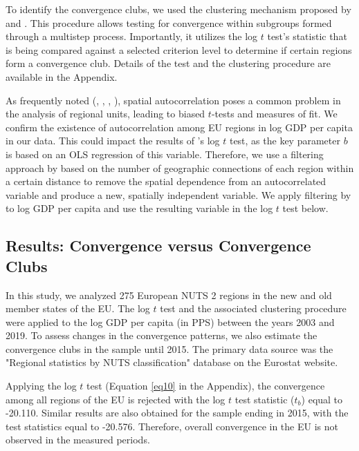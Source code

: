 \documentclass[11pt]{article}
\begin{document}
To identify the convergence clubs, we used the clustering mechanism proposed by \citet{phillips2009economic} and \citet{bartkowska2012regional}. This procedure allows testing for convergence within subgroups formed through a multistep process. Importantly, it utilizes the log $t$ test's statistic that is being compared against a selected criterion level to determine if certain regions form a convergence club. Details of the test and the clustering procedure are available in the Appendix.

As frequently noted (\citet{dall2008regional}, \citet{magrini2004regional}, \citet{anselin1991properties}, \citet{anselin2001spatial}), spatial autocorrelation poses a common problem in the analysis of regional units, leading to biased $t$-tests and measures of fit. We confirm the existence of autocorrelation among EU regions in log GDP per capita in our data. This could impact the results of \citeauthor{phillips2007transition}'s log $t$ test, as the key parameter $b$ is based on an OLS regression of this variable. Therefore, we use a filtering approach by \cite{getis2002comparative} based on the number of geographic connections of each region within a certain distance to remove the spatial dependence from an autocorrelated variable and produce a new, spatially independent variable. We apply filtering by \cite{getis2002comparative} to log GDP per capita and use the resulting variable in the log $t$ test below.

\subsection{Results: Convergence versus Convergence Clubs}
In this study, we analyzed 275 European NUTS 2 regions in the new and old member states of the EU. The log $t$ test and the associated clustering procedure were applied to the log GDP per capita (in PPS) between the years 2003 and 2019. To assess changes in the convergence patterns, we also estimate the convergence clubs in the sample until 2015. The primary data source was
 the "Regional statistics by NUTS classification" database on the Eurostat website.

Applying the log $t$ test (Equation \ref{eq10} in the Appendix), the convergence among all regions of the EU is rejected with the log $t$ test statistic ($t_b$) equal to -20.110. Similar results are also obtained for the sample ending in 2015, with the test statistics equal to -20.576. Therefore, overall convergence in the EU is not observed in the measured periods.
\end{document}
